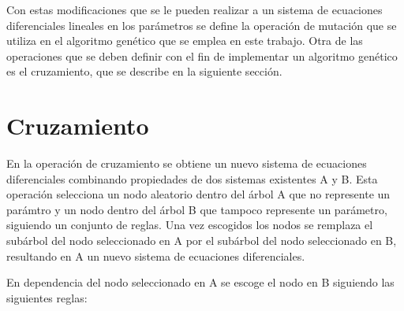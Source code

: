 
Con estas modificaciones que se le pueden realizar a un sistema de ecuaciones diferenciales lineales en los parámetros se define la operación de mutación que se utiliza en el algoritmo genético que se emplea en este trabajo. Otra de las operaciones que se deben definir con el fin de implementar un algoritmo genético es el cruzamiento, que se describe en la siguiente sección.

\section{Cruzamiento}\label{section:xcross}

En la operación de cruzamiento se obtiene un nuevo sistema de ecuaciones diferenciales combinando propiedades de dos sistemas existentes A y B. Esta operación selecciona un nodo aleatorio dentro del árbol A que no represente un parámtro y un nodo dentro del árbol B que tampoco represente un parámetro, siguiendo un conjunto de reglas. Una vez escogidos los nodos se remplaza el subárbol del nodo seleccionado en A por el subárbol del nodo seleccionado en B, resultando en A un nuevo sistema de ecuaciones diferenciales.

En dependencia del nodo seleccionado en A se escoge el nodo en B siguiendo las siguientes reglas:


